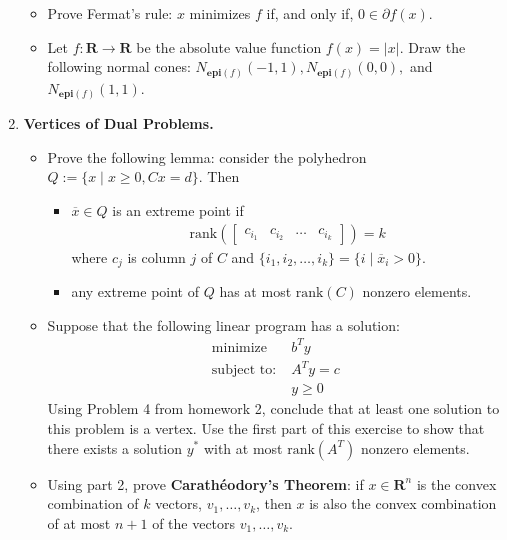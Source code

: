 \documentclass[11pt]{article}
\newcommand{\RR}{\mathbf{R}}
\newcommand{\epi}{\textbf{epi}}
\begin{document}
\begin{enumerate}
\begin{itemize}
\item Prove Fermat's rule: $x$ minimizes $f$ if, and only if, $ 0 \in \partial f(x)$.
\item Let $f : \RR \rightarrow \RR$ be the absolute value function $f(x) = |x|$. Draw the following normal cones: $N_{\epi(f)}(-1, 1), N_{\epi(f)}(0, 0), $ and $N_{\epi(f)}(1, 1)$.
\end{itemize}
\item \textbf{Vertices of Dual Problems.} 
\begin{itemize} 
\item Prove the following lemma: consider the polyhedron $Q:= \{x \mid x \geq 0, Cx = d\}$. Then
\begin{itemize}
\item $\overline{x}\in Q$ is an extreme point if 
\begin{align*}
\text{rank}\left(\begin{bmatrix} c_{i_1} & c_{i_2}& \ldots & c_{i_k} \end{bmatrix}\right) = k
\end{align*}
where $c_j$ is column $j$ of $C$ and $\{i_1,i_2, \ldots, i_k\} = \{i \mid \overline{x}_i > 0\}.$
\item any extreme point of $Q$ has at most $\text{rank}(C)$ nonzero elements.
\end{itemize}
\item Suppose that the following linear program has a solution:
\begin{align*}
\text{minimize} &\;  b^T y  \\
\text{subject to:}&\; A^Ty = c\\
&\; y \geq 0
\end{align*}
Using Problem 4 from homework 2, conclude that at least one solution to this  problem is a vertex. Use the first part of this exercise to show that there exists a solution $y^\ast$ with at most $\text{rank}(A^T)$ nonzero elements. 
\item Using part 2, prove \textbf{Carath{\'e}odory's Theorem}: if $x \in \RR^n$ is the convex combination of $k$ vectors, $v_1, \ldots, v_k$, then $x$ is also the convex combination of at most $n+1$ of the vectors $v_1, \ldots, v_k$.
\end{itemize}
\end{enumerate}
\end{document}
